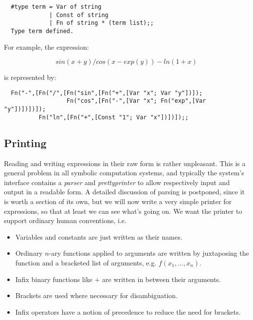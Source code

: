 \begin{boxed}\begin{verbatim}
  #type term = Var of string
             | Const of string
             | Fn of string * (term list);;
  Type term defined.
\end{verbatim}\end{boxed}

\noindent For example, the expression:

$$ sin(x + y) / cos(x - exp(y)) - ln(1 + x) $$

\noindent is represented by:

\begin{boxed}\begin{verbatim}
  Fn("-",[Fn("/",[Fn("sin",[Fn("+",[Var "x"; Var "y"])]);
                  Fn("cos",[Fn("-",[Var "x"; Fn("exp",[Var "y"])])])]);
          Fn("ln",[Fn("+",[Const "1"; Var "x"])])]);;
\end{verbatim}\end{boxed}

\subsection{Printing}

Reading and writing expressions in their raw form is rather unpleasant. This is
a general problem in all symbolic computation systems, and typically the
system's interface contains a {\em parser} and {\em prettyprinter} to allow
respectively input and output in a readable form. A detailed discussion of
parsing is postponed, since it is worth a section of its own, but we will now
write a very simple printer for expressions, so that at least we can see what's
going on. We want the printer to support ordinary human conventions, i.e.

\begin{itemize}

\item Variables and constants are just written as their names.

\item Ordinary $n$-ary functions applied to arguments are written by
juxtaposing the function and a bracketed list of arguments, e.g.
$f(x_1,\ldots,x_n)$.

\item Infix binary functions like $+$ are written in between their
arguments.

\item Brackets are used where necessary for disambiguation.

\item Infix operators have a notion of precedence to reduce the need for
brackets.

\end{itemize}

